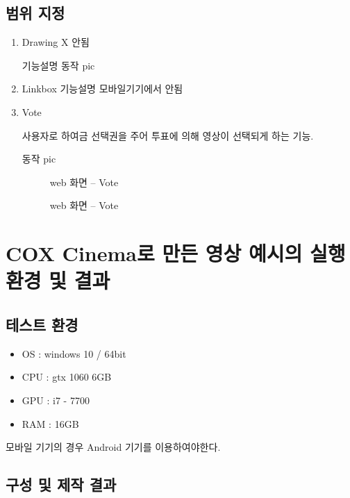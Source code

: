 \documentclass{oblivoir}
\newcommand{\spec}{
    \begin{itemize}
        \item OS : windows 10 / 64bit
        \item CPU : gtx 1060 6GB
        \item GPU : i7 - 7700
        \item RAM : 16GB
    \end{itemize}
    }
\begin{document}
\subsection{범위 지정}

\begin{enumerate}
    \item Drawing X 안됨

    기능설명
    동작 pic


    \item Linkbox
    기능설명 모바일기기에서 안됨

    \item Vote

    사용자로 하여금 선택권을 주어 투표에 의해 영상이 선택되게 하는 기능.

    동작 pic

    \begin{figure}[h!]
    \centering
    \caption{web 화면 – Vote}
    \end{figure} 


    \begin{figure}[h!]
    \centering
    \caption{web 화면 – Vote}
    \end{figure} 

\end{enumerate}

\section{ COX Cinema로 만든 영상 예시의 실행환경 및 결과 }

\subsection{테스트 환경 }
\spec
모바일 기기의 경우 Android 기기를 이용하여야한다.

\subsection{ 구성 및 제작 결과}
\end{document}
